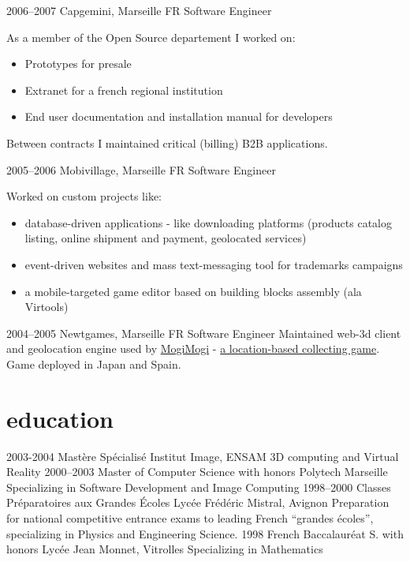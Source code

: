 \documentclass[]{friggeri}
\begin{document}
\clearpage

\begin{entrylist}
  \entry
    {2006–2007}
    {Capgemini, Marseille FR}
    {Software Engineer}
    {As a member of the Open Source departement I worked on:
    \begin{itemize}
    \item Prototypes for presale
    \item Extranet for a french regional institution
    \item End user documentation and installation manual for developers
    \end{itemize}
    Between contracts I maintained critical (billing) B2B applications.}
  \entry
    {2005–2006}
    {Mobivillage, Marseille FR}
    {Software Engineer}
    {Worked on custom projects like:
    \begin{itemize}
    \item database-driven applications - like downloading platforms
    (products catalog listing, online shipment and payment, geolocated services)
    \item event-driven websites and mass text-messaging tool for
    trademarks campaigns
    \item a mobile-targeted game editor based on building blocks
    assembly (ala Virtools)
    \end{itemize}}
  \entry
    {2004–2005}
    {Newtgames, Marseille FR}
    {Software Engineer}
    {Maintained web-3d client and geolocation engine used by
    \href{http://mogimogi.com}{MogiMogi} - \href{http://thefeaturearchives.com/100501.html}{a location-based collecting game}.
    Game deployed in Japan and Spain.}
\end{entrylist}

\section{education}

\begin{entrylist}
  \entry
    {2003-2004}
    {Mastère Spécialisé}
    {Institut Image, ENSAM}
    {3D computing and Virtual Reality}
  \entry
    {2000–2003}
    {Master of Computer Science with honors}
    {Polytech Marseille}
    {Specializing in Software Development and Image Computing}
  \entry
    {1998–2000}
    {Classes Préparatoires aux Grandes Écoles}
    {Lycée Frédéric Mistral, Avignon}
    {Preparation for national competitive entrance exams to leading French
    ``grandes écoles'', specializing in Physics and Engineering Science.}
  \entry
    {1998}
    {French Baccalauréat S. with honors}
    {Lycée Jean Monnet, Vitrolles}
    {Specializing in Mathematics}
\end{entrylist}
\end{document}
